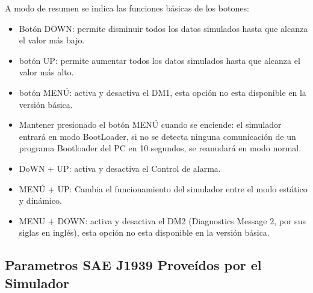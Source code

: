 A modo de resumen se indica las funciones básicas de los botones:
\begin{itemize}
\item Botón DOWN: permite disminuir todos los datos simulados hasta que alcanza el valor más bajo.
 \item botón UP: permite aumentar todos los datos simulados hasta que alcanza el valor más alto.
\item botón MENÚ: activa y desactiva el DM1, esta opción no esta disponible en la versión básica.
\item Mantener presionado el botón MENÚ cuando se enciende: el simulador entrará en modo BootLoader, si no se detecta ninguna comunicación de un programa Bootloader del PC en 10 segundos, se reanudará en modo normal.
 \item DoWN + UP: activa y desactiva el Control de alarma.
\item MENÚ + UP: Cambia el funcionamiento del simulador entre el modo estático y dinámico.
\item MENU + DOWN: activa y desactiva el DM2 (Diagnostics Message 2, por sus siglas en inglés), esta opción no esta disponible en la versión básica.
\end{itemize}

\subsection{Parametros SAE J1939 Proveídos por el Simulador}

